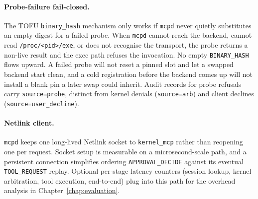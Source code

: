 \paragraph{Probe-failure fail-closed.}
The TOFU \texttt{binary\_\allowbreak hash} mechanism only works if \texttt{mcpd} never quietly substitutes an empty digest for a failed probe.
When \texttt{mcpd} cannot reach the backend, cannot read \texttt{/\allowbreak proc/\allowbreak <pid>/\allowbreak exe}, or does not recognise the transport, the probe returns a non-live result and the exec path refuses the invocation.
No empty \texttt{BINARY\_\allowbreak HASH} flows upward. A failed probe will not reset a pinned slot and let a swapped backend start clean, and a cold registration before the backend comes up will not install a blank pin a later swap could inherit.
Audit records for probe refusals carry \texttt{source=probe}, distinct from kernel denials (\texttt{source=arb}) and client declines (\texttt{source=user\_\allowbreak decline}).

\paragraph{Netlink client.}
\texttt{mcpd} keeps one long-lived Netlink socket to \texttt{kernel\_\allowbreak mcp} rather than reopening one per request.
Socket setup is measurable on a microsecond-scale path, and a persistent connection simplifies ordering \texttt{APPROVAL\_\allowbreak DECIDE} against its eventual \texttt{TOOL\_\allowbreak REQUEST} replay.
Optional per-stage latency counters (session lookup, kernel arbitration, tool execution, end-to-end) plug into this path for the overhead analysis in Chapter~\ref{chap:evaluation}.


